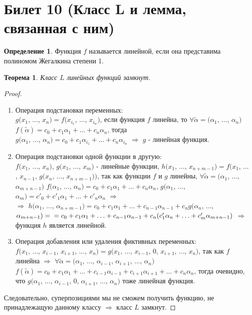 \documentclass[a4paper, 12pt]{article}
\theoremstyle{definition}
\newtheorem*{definition}{Определение}
\theoremstyle{plain}
\newtheorem*{theorem}{Теорема}
\theoremstyle{remark}
\begin{document}
  \section{Билет 10 (Класс L и лемма, связанная с ним)}
  \begin{definition}
    Функция $f$ называется линейной, если она представима полиномом Жегалкина степени 1.
  \end{definition}
  \begin{theorem}
    Класс $L$ линейных функций замкнут.
  \end{theorem}
  \begin{proof}
    \begin{enumerate}
      \item Операция подстановки переменных:\\
      $g(x_1$, $\ldots$, $x_n)=f(x_{i_1}$, $\ldots$, $x_{i_n})$, если функция $f$ линейна, то $\forall\tilde{\alpha}=(\alpha_1$, $\ldots$, $\alpha_n)$ $f(\tilde{\alpha})=c_0+c_1\alpha_1+\ldots+c_n\alpha_n$, тогда\\
      $g(\alpha_1$, $\ldots$, $\alpha_n)=c_0+c_1\alpha_{i_1}+\ldots+c_n\alpha_{i_n}$ $\Longrightarrow$ $g$ - линейная функция.
      \item Операция подстановки одной функции в другую:\\ 
      $f(x_{1}$, $\ldots$, $x_{n})$, $g(x_{1}$, $\ldots$, $x_{m})$ - линейные функции, $h(x_1$, $\ldots$, $x_{n+m-1})=f(x_1$, $\ldots$, $x_{n-1}$, $g(x_n$, $\ldots$, $x_{n+m-1}))$, так как функции $f$ и $g$ линейны, $\forall\tilde{\alpha}=(\alpha_1$, $\ldots$, $\alpha_{m+n-1})$ $f(\alpha_1$, $\ldots$, $\alpha_n)=c_0+c_1\alpha_1+\ldots+c_n\alpha_n$, $g(\alpha_1$, $\ldots$, $\alpha_m)=c'_0+c'_1\alpha_1+\ldots+c'_n\alpha_n$ $\Longrightarrow$\\
      $\Longrightarrow$ $h(\alpha_1$, $\ldots$, $\alpha_{n+m-1})=c_0+c_1\alpha_1+\ldots+c_{n-1}\alpha_{n-1}+c_ng(\alpha_n$, $\ldots$, $\alpha_{m+n-1})=\\=c_0+c_1\alpha_1+\ldots+c_{n-1}\alpha_{n-1}+c_n(c'_1\alpha_n+\ldots+c'_m\alpha_{m+n-1})$ $\Longrightarrow$ функция $h$ является линейной.
      \item Операция добавления или удаления фиктивных переменных:\\$f(x_1$, $\ldots$, $x_{i-1}$, $x_{i+1}$, $\ldots$, $x_n)=g(x_1$, $\ldots$, $x_{i-1}$, $0$, $x_{i+1}$, $\ldots$, $x_n)$, так как $f$ линейна $\Longrightarrow$ $\forall\tilde{\alpha}=(\alpha_1$, $\ldots$, $\alpha_{i-1}$, $\alpha_{i+1}$, $\ldots$, $\alpha_n)$ $f(\tilde{\alpha})=c_0+c_1\alpha_1+\ldots+c_{i-1}\alpha_{i-1}+c_{i+1}\alpha_{i+1}+\ldots+c_n\alpha_n$, тогда очевидно, что $g(\alpha_1$, $\ldots$, $\alpha_{i-1}$, $0$, $\alpha_{i+1}$, $\ldots$, $\alpha_n)$ тоже линейная функция. 
    \end{enumerate}
    Следовательно, суперпозициями мы не сможем получить функцию, не принадлежащую данному классу $\Longrightarrow$ класс $L$ замкнут. 
  \end{proof}
\end{document}
